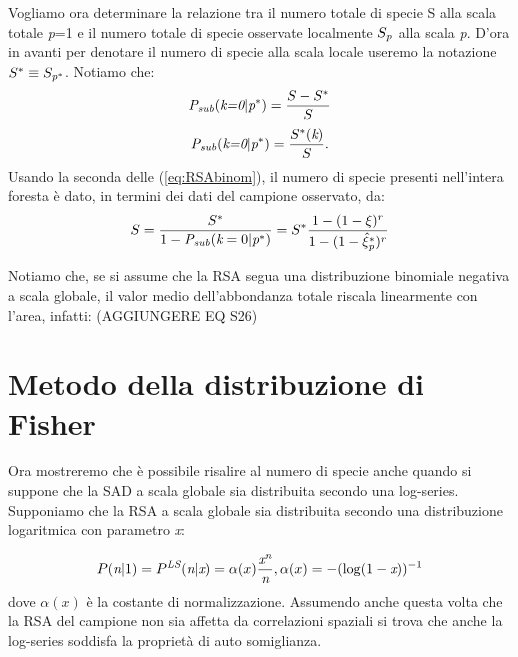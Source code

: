 Vogliamo ora determinare la relazione tra il numero totale di specie S alla scala totale \emph{p}=1 e il numero totale di specie osservate localmente $S_\emph{p}$ alla scala \emph{p}.
D'ora in avanti per denotare il numero di specie alla scala locale useremo la notazione $S^*\equiv S_{\emph{p}^*}$.
Notiamo che:
\begin{equation}
\emph{P}_\emph{sub}(\emph{k=0}|\emph{p}^*)=\frac{S-S^*}{S}
\end{equation}
\begin{equation}
    \emph{P}_\emph{sub}(\emph{k=0}|\emph{p}^*)=\frac{S^*(\emph{k})}{S}.
\end{equation}
Usando la seconda delle (\ref{eq:RSAbinom}), il numero di specie presenti nell'intera foresta è dato, in termini dei dati del campione osservato, da:
\begin{equation}
S=\frac{S^*}{1-\emph{P}_\emph{sub}(\emph{k}=0|\emph{p}^*)}=S^*\frac{1-(1-\xi)^r}{1-(1-\hat \xi_{\emph{p}}^*)^r}
\label{eq:upscaleNB}
\end{equation}

Notiamo che, se si assume che la RSA segua una distribuzione binomiale negativa a scala globale, il valor medio dell'abbondanza totale riscala linearmente con l'area, infatti:
(AGGIUNGERE EQ S26)

\section{Metodo della distribuzione di Fisher}
Ora mostreremo che è possibile risalire al numero di specie anche quando si suppone che la SAD a scala globale sia distribuita secondo una log-series.\\
Supponiamo che la RSA a scala globale sia distribuita secondo una distribuzione logaritmica con parametro \emph{x}:

\begin{equation}
P(\emph{n}|1)=P^{\emph{LS}}(\emph{n}|\emph{x})=\alpha(x)\frac{\emph{x}^\emph{n}}{\emph{n}}, \alpha(x)=-(\log(1-\emph{x}))^{-1}
\end{equation}
dove $\alpha(x)$ è la costante di normalizzazione.
Assumendo anche questa volta che la RSA del campione non sia affetta da correlazioni spaziali si trova che anche la log-series soddisfa la proprietà di auto somiglianza.

